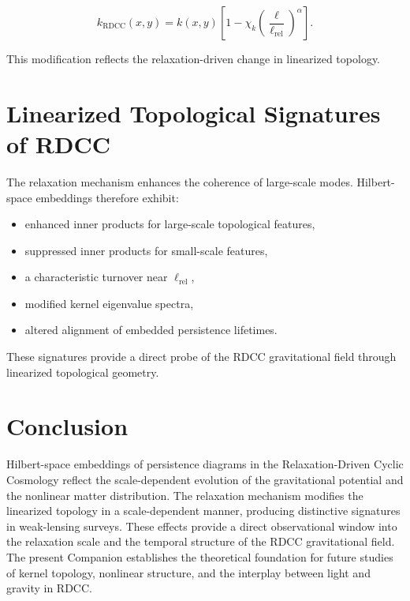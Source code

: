 \documentclass[11pt,a4paper]{article}
\begin{document}
\begin{equation}
    k_{\mathrm{RDCC}}(x,y)
    = k(x,y)
      \left[
        1 - \chi_{k}
        \left(\frac{\ell}{\ell_{\mathrm{rel}}}\right)^{\alpha}
      \right].
\end{equation}

This modification reflects the relaxation-driven change in linearized topology.
\section{Linearized Topological Signatures of RDCC}

The relaxation mechanism enhances the coherence of large-scale modes. Hilbert-space 
embeddings therefore exhibit:

\begin{itemize}
    \item enhanced inner products for large-scale topological features,
    \item suppressed inner products for small-scale features,
    \item a characteristic turnover near $\ell_{\mathrm{rel}}$,
    \item modified kernel eigenvalue spectra,
    \item altered alignment of embedded persistence lifetimes.
\end{itemize}

These signatures provide a direct probe of the RDCC gravitational field through 
linearized topological geometry.
\section{Conclusion}

Hilbert-space embeddings of persistence diagrams in the Relaxation-Driven Cyclic 
Cosmology reflect the scale-dependent evolution of the gravitational potential and 
the nonlinear matter distribution. The relaxation mechanism modifies the 
linearized topology in a scale-dependent manner, producing distinctive signatures 
in weak-lensing surveys. These effects provide a direct observational window into 
the relaxation scale and the temporal structure of the RDCC gravitational field. 
The present Companion establishes the theoretical foundation for future studies of 
kernel topology, nonlinear structure, and the interplay between light and gravity 
in RDCC.


\nocite{*}

\end{document}
